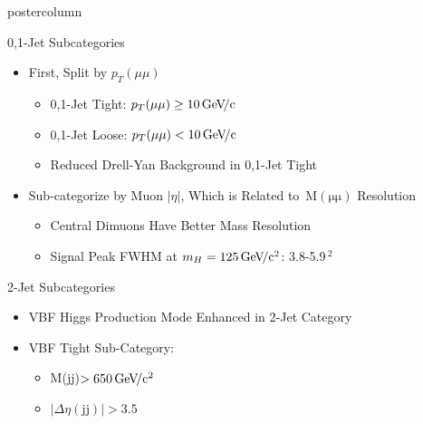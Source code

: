 \documentclass[final,hyperref={pdfpagelabels=false}]{beamer}
\newcommand{\mmm}{\ensuremath{\,\mathrm{M(\mu\mu)}}}
\newcommand{\pt}{\ensuremath{p_T}}
\newcommand{\ptmm}{\ensuremath{\pt(\mu\mu)}}
\newcommand{\GeVc}{\,\text{Ge\kern -0.1em V\!/c}}
\newcommand{\GeVcc}{\,\text{Ge\kern -0.1em  V\!/c}\ensuremath{\mathrm{^2}}}
\begin{document}
\begin{frame}
\begin{columns}
\begin{column}{.49\textwidth}
\begin{beamercolorbox}[center,wd=\textwidth]{postercolumn}
\begin{minipage}[T]{.95\textwidth}
{\begin{block}{0,1-Jet Subcategories}
              \begin{itemize}
                \item First, Split by \ptmm{}
                \begin{itemize}
                  \item 0,1-Jet Tight: $\ptmm{}\geq10\GeVc{}$
                  \item 0,1-Jet Loose: $\ptmm{}<10\GeVc{}$
                  \item Reduced Drell-Yan Background in 0,1-Jet Tight
                \end{itemize}
                \item Sub-categorize by Muon $|\eta|$, Which is Related to \mmm{} Resolution
                \begin{itemize}
                  \item Central Dimuons Have Better Mass Resolution
                  \item Signal Peak FWHM at $m_H=125\GeVcc{}$: 3.8-5.9\GeVcc{} 
                \end{itemize}
              \end{itemize}
            \end{block}
            \vfill
            \begin{block}{2-Jet Subcategories}
              \begin{itemize}
                \item VBF Higgs Production Mode Enhanced in 2-Jet Category
                \item VBF Tight Sub-Category: 
                \begin{itemize}
                  \item M(jj)$>650\GeVcc{}$ 
                  \item $|\Delta\eta(\mathrm{jj})|>3.5$

\end{itemize}
\end{itemize}
\end{block}}
\end{minipage}
\end{beamercolorbox}
\end{column}
\end{columns}
\end{frame}
\end{document}
